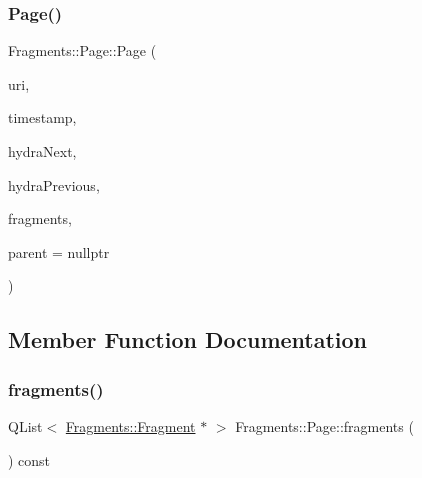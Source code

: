 \mbox{\label{classFragments_1_1Page_ac345c0f46af8796c9f7fa702f71f240c}} 
\subsubsection{\texorpdfstring{Page()}{Page()}\hspace{0.1cm}{\footnotesize\ttfamily [2/2]}}
{\footnotesize\ttfamily Fragments\+::\+Page\+::\+Page (\begin{DoxyParamCaption}\item[{const Q\+Url \&}]{uri,  }\item[{const Q\+Date\+Time \&}]{timestamp,  }\item[{const Q\+Url \&}]{hydra\+Next,  }\item[{const Q\+Url \&}]{hydra\+Previous,  }\item[{const Q\+List$<$ \mbox{\hyperlink{classFragments_1_1Fragment}{Fragments\+::\+Fragment}} $\ast$$>$ \&}]{fragments,  }\item[{Q\+Object $\ast$}]{parent = {\ttfamily nullptr} }\end{DoxyParamCaption})\hspace{0.3cm}{\ttfamily [explicit]}}



\subsection{Member Function Documentation}
\mbox{\label{classFragments_1_1Page_ab2460084209c3fe9211f70689ad78019}} 
\subsubsection{\texorpdfstring{fragments()}{fragments()}}
{\footnotesize\ttfamily Q\+List$<$ \mbox{\hyperlink{classFragments_1_1Fragment}{Fragments\+::\+Fragment}} $\ast$ $>$ Fragments\+::\+Page\+::fragments (\begin{DoxyParamCaption}{ }\end{DoxyParamCaption}) const}

\mbox{\label{classFragments_1_1Page_a6d449124d048af31d3e1e24a66c34636}} 
